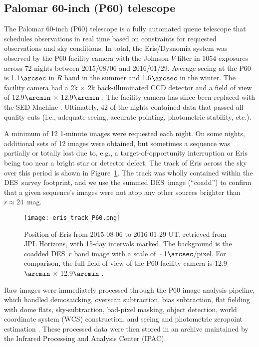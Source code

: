 \documentclass[onecolumn]{aastex631}
\newcommand{\des}{DES}
\begin{document}
\subsection{Palomar 60-inch (P60) telescope}
The Palomar 60-inch (P60) telescope is a fully automated queue telescope that schedules observations in real time based on constraints for requested observations and sky conditions. In total, the Eris/Dysnomia system was observed by the P60 facility camera with the Johnson $V$ filter in 1054 exposures across 72 nights between 2015/08/06 and 2016/01/29. Average seeing at the P60 is 1.1$\arcsec$ in $R$ band in the summer and 1.6$\arcsec$ in the winter. The facility camera 
had a 2k $\times$ 2k back-illuminated CCD detector and a field of view of 12.9$\arcmin$ $\times$ 12.9$\arcmin$ \citep{Cenko2006}. The facility camera has since been replaced with the SED Machine \citep{SEDMachine}. Ultimately, 42 of the nights contained data that passed all quality cuts (i.e., adequate seeing, accurate pointing, photometric stability, etc.).

A minimum of 12 1-minute images were requested each night. On some nights, additional sets of 12 images were obtained, but sometimes a sequence was partially or totally lost due to, e.g., a target-of-opportunity interruption or Eris being too near a bright star or detector defect. The track of Eris across the sky over this period is shown in Figure~\ref{eris_pos}. The track was wholly contained within the \des\ survey footprint, and we use the summed \des\ image (``coadd'') to confirm that a given sequence's images were not atop any other sources brighter than $r\approx24$~mag.

\begin{figure}[ht!]
\begin{center}
\texttt{[image: eris\_track\_P60.png]}
\caption{Position of Eris from 2015-08-06 to 2016-01-29 UT, retrieved from JPL Horizons, with 15-day intervals marked. The background is the coadded \des\ $r$ band image with a scale of $\sim$1$\arcsec$/pixel. For comparison, the full field of view of the P60 facility camera is 12.9$\arcmin$ $\times$ 12.9$\arcmin$ \citep{Cenko2006}. \label{eris_pos}}
\end{center}
\end{figure}

Raw images were immediately processed through the P60 image analysis pipeline, which handled demosaicking, overscan subtraction, bias subtraction, flat fielding with dome flats, sky-subtraction, bad-pixel masking, object detection, world coordinate system (WCS) construction, and seeing and photometric zeropoint estimation \citep{Cenko2006}. These processed data were then stored in an archive maintained by the Infrared Processing and Analysis Center (IPAC).
\end{document}
